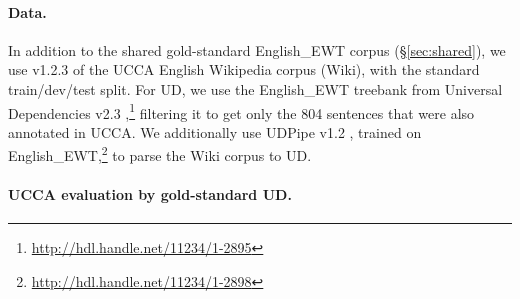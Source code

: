\documentclass[11pt,a4paper]{article}
\begin{document}
\paragraph{Data.}

In addition to the shared gold-standard English\_EWT corpus (\S\ref{sec:shared}),
we use v1.2.3 of the UCCA English Wikipedia corpus (Wiki),
with the standard train/dev/test split.
For UD,
we use the English\_EWT treebank from Universal Dependencies v2.3
\cite{11234/1-2895},\footnote{\url{http://hdl.handle.net/11234/1-2895}}
filtering it to get only the 804 sentences that were also annotated in UCCA.
We additionally use UDPipe v1.2 \cite{udpipe,udpipe:2017},
trained on
English\_EWT,\footnote{\url{http://hdl.handle.net/11234/1-2898}}
to parse the Wiki corpus to UD.



%


\paragraph{UCCA evaluation by gold-standard UD.}
\end{document}
